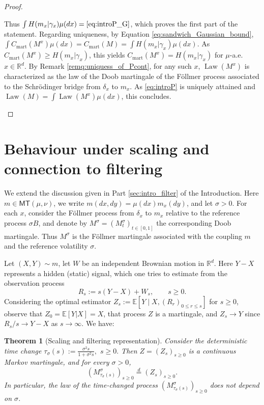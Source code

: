 \documentclass[reqno, a4paper]{amsart}
\theoremstyle{plain}
\newtheorem{theorem}{Theorem}
\theoremstyle{definition}
\theoremstyle{remark}
\numberwithin{equation}{section}
\numberwithin{theorem}{section}
\newcommand{\R}{\mathbb{R}}
\newcommand{\E}{\mathbb{E}}
\newcommand{\MT}{\mathsf{MT}}
\newcommand{\Law}{\operatorname{Law}}
\begin{document}
\begin{proof}
\begin{enumerate}
\begin{equation}
			\end{equation}
			Thus $\int H(m_x|\gamma_x) \mu(dx) = \eqref{eq:introP_G}$, which proves the first part of the statement. Regarding uniqueness, by Equation \eqref{eq:sandwich_Gaussian_bound},  $\int C_{\mathrm{mart}}(M^x) \mu(dx) = C_{\mathrm{mart}}(M) =  \int H(m_x|\gamma_x) \mu(dx).$ As $C_{\mathrm{mart}}(M^x) \geq H(m_x|\gamma_x)$, this yields $C_{\mathrm{mart}}(M^x) = H(m_x|\gamma_x)$ for $\mu$-a.e. $x \in \R^d.$ By Remark \ref{remq:uniquess_of_Pcont}, for any such $x$,  $\Law(M^x)$ is characterized as the law of the Doob martingale of the Föllmer process associated to the  Schrödinger bridge from $\delta_x$ to $m_x$. As \eqref{eq:introP} is uniquely attained and $\Law(M) = \int \Law(M^x) \mu(dx)$, this concludes.  \qedhere 
		\end{enumerate}
	\end{proof}
	
	
	
	\section{Behaviour under scaling and connection to filtering}
	\label{sec:filtering}
	
	We extend the discussion given in Part \ref{sec:intro_filter} of the Introduction.  
	Here \(m\in\MT(\mu,\nu)\), we write \(m(dx,dy)=\mu(dx)m_x(dy)\), and let \(\sigma>0\).
	For each \(x\), consider the F\"ollmer process from \(\delta_x\) to \(m_x\) relative to the reference process \(\sigma B\), and denote by \(M^\sigma=(M_t^\sigma)_{t\in[0,1]}\) the corresponding Doob martingale.
	Thus \(M^\sigma\) is the F\"ollmer martingale associated with the coupling \(m\) and the reference volatility \(\sigma\).
	
	
	
	
	Let \((X,Y)\sim m\), let \(W\) be an independent Brownian motion in \(\R^d\).
	Here \(Y-X\) represents a hidden (static) signal, which one tries to estimate from the observation process
	\[
	R_s:=s(Y-X)+W_s, \qquad s\ge 0.
	\]
	Considering the optimal estimator 
	$
	Z_s:=\E[Y\mid X,(R_r)_{0\le r\le s}]$ for $ s\ge 0$, observe that $Z_0=\mathbb E[Y|X]=X$, that process $Z$ is a martingale, and $Z_{s}\to Y$ since $R_s/s\to Y-X$ as $s\to\infty$.
	We have:
	
	
	\begin{theorem}[Scaling and filtering representation]\label{thm:intro_scaling_filter}
		Consider the deterministic time change 
		\( 
		\tau_\sigma(s):=\frac{\sigma^2 s}{1+\sigma^2 s},\) \( s\ge 0.
		\)
		Then \(Z=(Z_s)_{s\ge 0}\) is a continuous Markov martingale, and for every \(\sigma>0\),
		\[
		(M^\sigma_{\tau_\sigma(s)})_{s\ge 0}\stackrel{d}{=}(Z_s)_{s\ge 0}.
		\]
		In particular, the law of the time-changed process \((M^\sigma_{\tau_\sigma(s)})_{s\ge 0}\) does not depend on \(\sigma\).
	\end{theorem}
	
\end{document}
